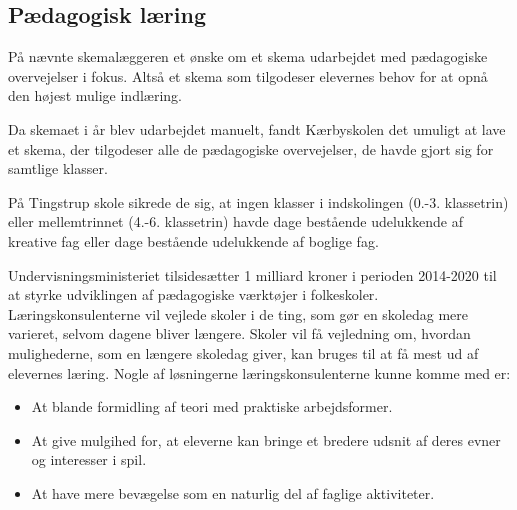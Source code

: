 \subsection{Pædagogisk læring}
\label{paedagogisk_laering}
På \school nævnte skemalæggeren et ønske om et skema udarbejdet med pædagogiske overvejelser i fokus. Altså et skema som tilgodeser elevernes behov for at opnå den højest mulige indlæring.

Da skemaet i år blev udarbejdet manuelt, fandt Kærbyskolen det umuligt at lave et skema, der tilgodeser alle de pædagogiske overvejelser, de havde gjort sig for samtlige klasser\cite{interview_Kaerby}.

På Tingstrup skole sikrede de sig, at ingen klasser i indskolingen (0.-3. klassetrin) eller mellemtrinnet (4.-6. klassetrin) havde dage bestående udelukkende af kreative fag eller dage bestående udelukkende af boglige fag. 

Undervisningsministeriet tilsidesætter 1 milliard kroner i perioden 2014-2020 til at styrke udviklingen af pædagogiske værktøjer i folkeskoler. Læringskonsulenterne vil vejlede skoler i de ting, som gør en skoledag mere varieret, selvom dagene bliver længere. Skoler vil få vejledning om, hvordan mulighederne, som en længere skoledag giver, kan bruges til at få mest ud af elevernes læring. Nogle af løsningerne læringskonsulenterne kunne komme med er:
\begin{itemize}
	\item At blande formidling af teori med praktiske arbejdsformer.
	\item At give mulgihed for, at eleverne kan bringe et bredere udsnit af deres evner og interesser i spil.
	\item At have mere bevægelse som en naturlig del af faglige aktiviteter\cite{Paedagogisklaering}.
\end{itemize}